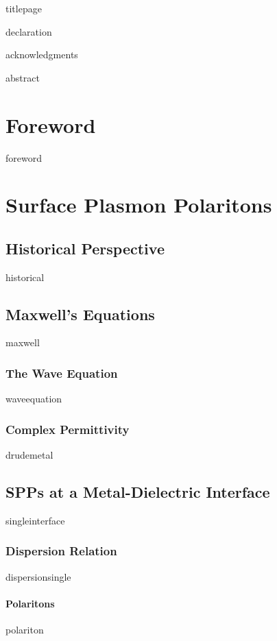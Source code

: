 \documentclass[a4paper,titlepage,onecolumn]{report}
\begin{document}
{titlepage}

{declaration}

{acknowledgments}

\tableofcontents

{abstract}



\chapter{Foreword} \label{ch:foreword}
{foreword}

\chapter{Surface Plasmon Polaritons} \label{ch:spp}
 \section{Historical Perspective}
 {historical}
 \section{Maxwell's Equations}
 {maxwell}
  \subsection{The Wave Equation}
  {waveequation}
  \subsection{Complex Permittivity}
  {drudemetal}
 \section{SPPs at a Metal-Dielectric Interface}
 {singleinterface}
  \subsection{Dispersion Relation}
  {dispersionsingle}
		\subsubsection{Polaritons}
		{polariton}
\end{document}
